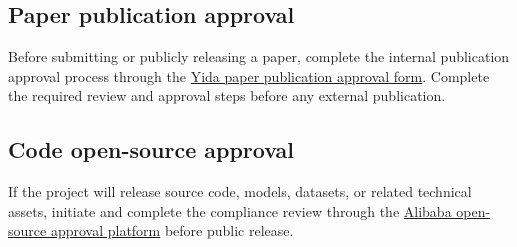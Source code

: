 \subsection{Paper publication approval}

Before submitting or publicly releasing a paper, complete the internal publication approval process through the \href{https://yida-group.alibaba-inc.com/APP_ZHVQTG6LH0I0BOSUJDQ8/workbench/FORM-82EC232FEEE9411BB171ECBA40FCD614T9QF?spm=ata.25287382.0.0.27147536laDwbn}{Yida paper publication approval form}. Complete the required review and approval steps before any external publication.

\subsection{Code open-source approval}

If the project will release source code, models, datasets, or related technical assets, initiate and complete the compliance review through the \href{https://lc.alibaba-inc.com/\#/lc/home?survey=1}{Alibaba open-source approval platform} before public release.

